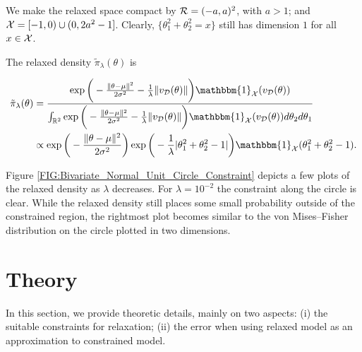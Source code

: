 \documentclass[10pt,fleqn]{article}
\DeclareMathOperator{\1}{\mathbbm{1}} \DeclareMathOperator{\bigO}{\mc O}
\begin{document}
We make the relaxed space compact by $\mathcal{R}=(-a,a)^2$, with $a> 1$; and $\mathcal{X}=[-1,0)\cup(0,2a^2-1]$. Clearly, $\{\theta_1^2+\theta_2^2=x\}$ still has
dimension $1$ for all $x\in \mathcal{X}$.

The relaxed density $\tilde{\pi}_\lambda(\theta)$ is

\begin{equation} \begin{split} \tilde{\pi}_\lambda(\theta)
&=\frac{\exp\bigg(-\frac{\|\theta-\mu\|^2}{2\sigma^2} -
\frac{1}{\lambda}\|v_{\mc
D}(\theta)\| \bigg) \mathbbm{1}_{\mc
X}(v_{\mc D}(\theta)) }{\int_{\mathbb{R}^2}
\exp\bigg(-\frac{\|\theta-\mu\|^2}{2\sigma^2}-\frac{1}{\lambda}\|v_{\mc
D}(\theta)\|
\bigg)  \mathbbm{1}_{\mc X}(v_{\mc D}(\theta))
d\theta_2d\theta_1}
\\ & \propto
\exp\bigg(-\frac{\|\theta-\mu\|^2}{2\sigma^2}\bigg)\exp\bigg(
- \frac{1}{\lambda}|\theta_1^2+\theta_2^2-1| \bigg)
\mathbbm{1}_{\mc X}(\theta_1^2+\theta_2^2-1).  \end{split}
\label{EQ:Relaxed_Density_Bivariate_Unit_Circle} \end{equation}

Figure \ref{FIG:Bivariate_Normal_Unit_Circle_Constraint} depicts a few plots
of the relaxed density as $\lambda$ decreases.  For $\lambda=10^{-2}$ the
constraint along the circle is clear. While the relaxed density still places
some small probability outside of the constrained region, the rightmost
plot becomes similar to the von Mises--Fisher distribution on the circle plotted in
two dimensions.





\section{Theory}

In this section, we provide theoretic details, mainly on two aspects: (i)
the suitable constraints for relaxation; (ii) the error when using relaxed
model as an approximation to constrained model.
\end{document}
